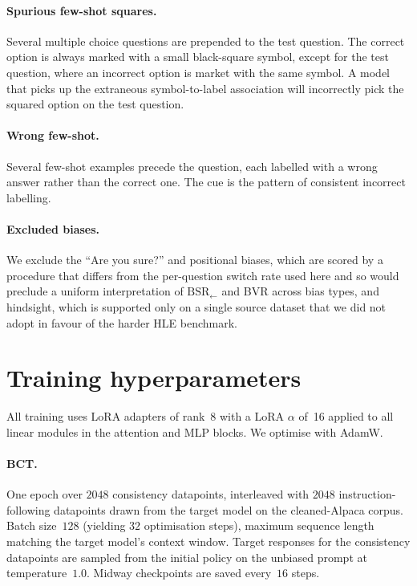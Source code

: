 \documentclass{article}
\begin{document}
\paragraph{Spurious few-shot squares.} Several multiple choice questions are prepended to the test question. The correct option is always marked with a small black-square
symbol, except for the test question, where an incorrect option is market with the same symbol. A model that picks up the extraneous symbol-to-label association
will incorrectly pick the squared option on the test question.

\paragraph{Wrong few-shot.} Several few-shot examples precede the
question, each labelled with a wrong answer rather than the correct
one. The cue is the pattern of consistent incorrect labelling.

\paragraph{Excluded biases.} We exclude the ``Are you sure?'' and
positional biases, which are scored by a procedure that differs from
the per-question switch rate used here and so would preclude a uniform
interpretation of $\text{BSR}_{\leftarrow}$ and BVR across bias
types, and hindsight, which is supported only on a single source
dataset that we did not adopt in favour of the harder HLE benchmark.

\section{Training hyperparameters}
\label{app:hyperparameters}

All training uses LoRA adapters of rank~8 with a LoRA $\alpha$ of~16
applied to all linear modules in the attention and MLP blocks. We optimise with AdamW.

\paragraph{BCT.} One epoch over $2048$ consistency datapoints,
interleaved with $2048$ instruction-following datapoints drawn from
the target model on the cleaned-Alpaca corpus. Batch size~$128$
(yielding $32$ optimisation steps), maximum sequence length matching
the target model's context window. Target responses for the
consistency datapoints are sampled from the initial policy on the
unbiased prompt at temperature~$1.0$. Midway checkpoints are saved
every~$16$ steps.
\end{document}
